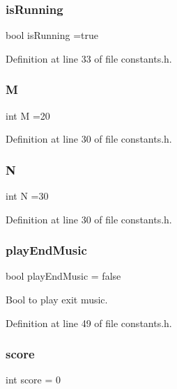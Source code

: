 \mbox{\label{constants_8h_a35e1fbda907c4c69651e7ffed1543106}} 
\subsubsection{isRunning}
{\footnotesize\ttfamily bool is\+Running =true}



Definition at line 33 of file constants.\+h.

\mbox{\label{constants_8h_a5e78dbd5fd0fc01ba7b98dd15e27221e}} 
\subsubsection{M}
{\footnotesize\ttfamily int M =20}



Definition at line 30 of file constants.\+h.

\mbox{\label{constants_8h_a7722c8ecbb62d99aee7ce68b1752f337}} 
\subsubsection{N}
{\footnotesize\ttfamily int N =30}



Definition at line 30 of file constants.\+h.

\mbox{\label{constants_8h_a6721cf32148dffc76987c66cf66711a4}} 
\subsubsection{playEndMusic}
{\footnotesize\ttfamily bool play\+End\+Music = false}



Bool to play exit music. 



Definition at line 49 of file constants.\+h.

\mbox{\label{constants_8h_aef160b7437d94056f1dc59646cd5b87d}} 
\subsubsection{score}
{\footnotesize\ttfamily int score = 0}



